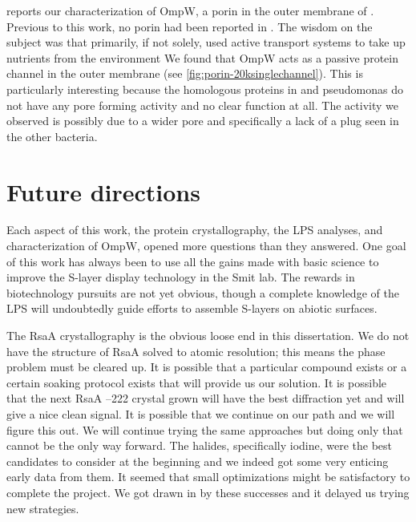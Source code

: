  reports our characterization of OmpW, a porin in the outer membrane of \caulobacter{}. Previous to this work, no porin had been reported in \caulobacter{}. The wisdom on the subject was that \caulobacter{} primarily, if not solely, used active transport systems to take up nutrients from the environment We found that OmpW acts as a passive protein channel in the outer membrane (see \cref{fig:porin-20ksinglechannel}). This is particularly interesting because the homologous proteins in \ecoli{} and \acl{pseudomonas} do not have any pore forming activity and no clear function at all.  The activity we observed is possibly due to a wider pore and specifically a lack of a plug seen in the other bacteria.  

\section{Future directions}\label{sec:future-directions}

Each aspect of this work, the protein crystallography, the \ac{LPS} analyses, and characterization of OmpW, opened more questions than they answered. One goal of this work has always been to use all the gains made with basic science to improve the \caulobacter{} \ac{S-layer} display technology in the Smit lab. The rewards in biotechnology pursuits are not yet obvious, though a complete knowledge of the \ac{LPS} will undoubtedly guide efforts to assemble \acp{S-layer} on abiotic surfaces.

The RsaA crystallography is the obvious loose end in this dissertation. We do not have the structure of RsaA solved to atomic resolution; this means the phase problem must be cleared up. It is possible that a particular compound exists or a certain soaking protocol exists that will provide us our solution. It is possible that the next RsaA --222 crystal grown will have the best diffraction yet and will give a nice clean signal. It is possible that we continue on our path and we will figure this out. We will continue trying the same approaches but doing only that cannot be the only way forward. The halides, specifically iodine, were the best candidates to consider at the beginning and we indeed got some very enticing early data from them. It seemed that small optimizations might be satisfactory to complete the project. We got drawn in by these successes and it delayed us trying new strategies.

